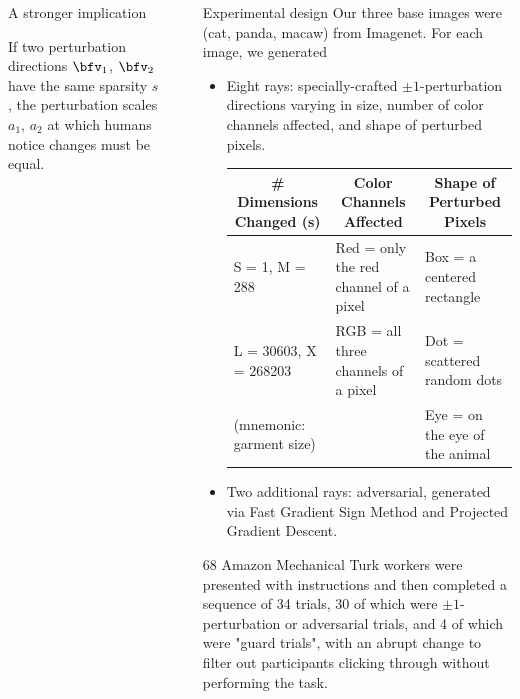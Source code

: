 \documentclass[final,notheorems]{beamer}
\newlength{\sepwidth}
\newlength{\colwidth}
\newcommand{\separatorcolumn}{\begin{column}{\sepwidth}\end{column}}
\begin{document}
\begin{frame}[t]
\begin{columns}[t]
\begin{column}{\colwidth}
\begin{block}{A stronger implication}
    \hspace*{.1\linewidth}\colorbox{highlightbg}{\begin{minipage}{.8\linewidth}
      If two perturbation directions $\bfv_1$, $\bfv_2$ have the same sparsity $s$, the perturbation scales $a_1$, $a_2$ at which humans notice changes must be equal.
    \end{minipage}}
  \end{block}
\end{column}

\separatorcolumn

\begin{column}{\colwidth}

  \begin{block}{Experimental design}
    Our three base images were (cat, panda, macaw) from Imagenet. For each image, we generated
    \begin{itemize}
      \item Eight rays: specially-crafted $\pm1$-perturbation directions varying in size, number of color channels affected, and shape of perturbed pixels.
        \begin{center}
          \begin{small}
            \begin{tabular}{l|l|l}
              \multicolumn{1}{c|}{\textbf{\# Dimensions Changed (s)}} & \multicolumn{1}{c|}{\textbf{Color Channels Affected}} & \multicolumn{1}{c}{\textbf{Shape of Perturbed Pixels}} \\\hline
              S = 1, M = 288 & Red = only the red channel of a pixel & Box = a centered rectangle \\
              L = 30603, X = 268203 & RGB = all three channels of a pixel & Dot = scattered random dots \\
              (mnemonic: garment size) & & Eye = on the eye of the animal \\
            \end{tabular}
          \end{small}
        \end{center}

      \item Two additional rays: adversarial, generated via Fast Gradient Sign Method and Projected Gradient Descent.
    \end{itemize}

    68 Amazon Mechanical Turk workers were presented with instructions and then completed a sequence of 34 trials, 30 of which were $\pm1$-perturbation or adversarial trials,
    and 4 of which were "guard trials", with an abrupt change to filter out participants clicking through without performing the task.


\end{block}
\end{column}
\end{columns}
\end{frame}
\end{document}

